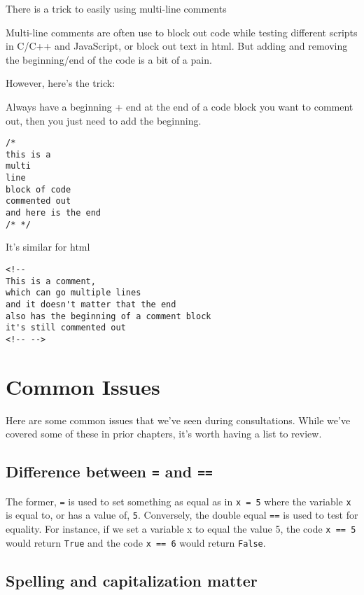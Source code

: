 \documentclass[
]{book}
\begin{document}
There is a trick to easily using multi-line comments

Multi-line comments are often use to block out code while testing different scripts in C/C++ and JavaScript, or block out text in html. But adding and removing the beginning/end of the code is a bit of a pain.

However, here's the trick:

Always have a beginning + end at the end of a code block you want to comment out, then you just need to add the beginning.

\begin{verbatim}
/* 
this is a 
multi
line
block of code
commented out
and here is the end 
/* */
\end{verbatim}

It's similar for html

\begin{verbatim}
<!-- 
This is a comment, 
which can go multiple lines 
and it doesn't matter that the end
also has the beginning of a comment block
it's still commented out
<!-- -->
\end{verbatim}

\chapter{Common Issues}\label{common-issues}

Here are some common issues that we've seen during consultations. While we've covered some of these in prior chapters, it's worth having a list to review.

\section{\texorpdfstring{Difference between \texttt{=} and \texttt{==}}{Difference between = and ==}}\label{difference-between-and}

The former, \texttt{=} is used to set something as equal as in \texttt{x\ =\ 5} where
the variable \texttt{x} is equal to, or has a value of, \texttt{5}. Conversely, the
double equal \texttt{==} is used to test for equality. For instance, if we set
a variable x to equal the value 5, the code \texttt{x\ ==\ 5} would return \texttt{True}
and the code \texttt{x\ ==\ 6} would return \texttt{False}.\\

\section{Spelling and capitalization matter}\label{spelling-and-capitalization-matter}
\end{document}
